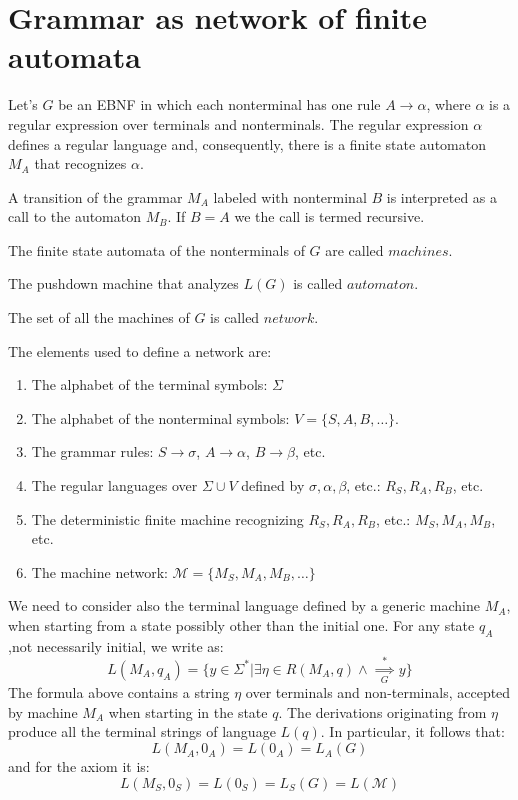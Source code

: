 \section{Grammar as network of finite automata}

Let's $G$ be an EBNF in which each nonterminal has one rule $A \rightarrow \alpha$, where $\alpha$ is a regular expression over terminals and nonterminals.
The regular expression $\alpha$ defines a regular language and, consequently, there is a finite state automaton $M_A$ that recognizes $\alpha$.

A transition of the grammar $M_A$ labeled with nonterminal $B$ is interpreted as a call to the automaton $M_B$. 
If $B=A$ we the call is termed recursive. 

\begin{definition}
    The finite state automata of the nonterminals of $G$ are called $machines$. 

    The pushdown machine that analyzes $L(G)$ is called $automaton$. 

    The set of all the machines of $G$ is called $network$.
\end{definition}
The elements used to define a network are: 
\begin{enumerate}
    \item The alphabet of the terminal symbols: $\Sigma$
    \item The alphabet of the nonterminal symbols: $V=\{S,A,B,\dots\}$.
    \item The grammar rules: $S \rightarrow \sigma$, $A \rightarrow \alpha$, $B \rightarrow \beta$, etc. 
    \item The regular languages over $\Sigma \cup V$ defined by $\sigma, \alpha, \beta$, etc.: $R_S,R_A,R_B$, etc. 
    \item The deterministic finite machine recognizing $R_S,R_A,R_B$, etc.: $M_S,M_A,M_B$, etc. 
    \item The machine network: $\mathcal{M}=\{M_S,M_A,M_B,\dots\}$
\end{enumerate}

We need to consider also the terminal language defined by a generic machine $M_A$, when starting from a state possibly other than the initial one. 
For any state $q_A$,not necessarily initial, we write as: 
\[L(M_A,q_A)=\{y \in \Sigma^{*}|\exists\eta\in R(M_A,q) \land \overset{*}{\underset{G}{\implies}} y\}\]
The formula above contains a string $\eta$ over terminals and non-terminals, accepted by machine $M_A$ when starting in the state $q$. 
The derivations originating from $\eta$ produce all the terminal strings of language $L(q)$. 
In particular, it follows that: 
\[L(M_A,0_A)=L(0_A) = L_A(G)\]
and for the axiom it is:
\[L(M_S,0_S)=L(0_S)=L_S(G) = L(\mathcal{M})\]

